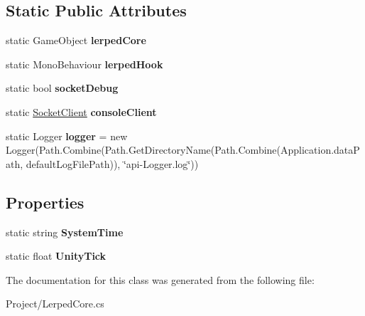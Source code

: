 \subsection*{Static Public Attributes}
\begin{DoxyCompactItemize}
\item 
\mbox{\label{class_lerp2_a_p_i_1_1_lerped_core_a4a12bc9584309efdafb06167891aa81a}} 
static Game\+Object {\bfseries lerped\+Core}
\item 
\mbox{\label{class_lerp2_a_p_i_1_1_lerped_core_a36e47f8f40f67a5a4f05398a161f8668}} 
static Mono\+Behaviour {\bfseries lerped\+Hook}
\item 
\mbox{\label{class_lerp2_a_p_i_1_1_lerped_core_ab9fe283b5fb0fc1b969c3c65ace74eb4}} 
static bool {\bfseries socket\+Debug}
\item 
\mbox{\label{class_lerp2_a_p_i_1_1_lerped_core_a16e880ea6278c92f3363dabb264a0eba}} 
static \hyperlink{class_lerp2_a_p_i_1_1_communication_1_1_sockets_1_1_socket_client}{Socket\+Client} {\bfseries console\+Client}
\item 
\mbox{\label{class_lerp2_a_p_i_1_1_lerped_core_a81701bd0c747037174737366a3c9e39b}} 
static Logger {\bfseries logger} = new Logger(Path.\+Combine(Path.\+Get\+Directory\+Name(Path.\+Combine(Application.\+data\+Path, default\+Log\+File\+Path)), \char`\"{}api-\/Logger.\+log\char`\"{}))
\end{DoxyCompactItemize}
\subsection*{Properties}
\begin{DoxyCompactItemize}
\item 
\mbox{\label{class_lerp2_a_p_i_1_1_lerped_core_aa7ee4068007163ee501483f0e305e653}} 
static string {\bfseries System\+Time}
\item 
\mbox{\label{class_lerp2_a_p_i_1_1_lerped_core_ac2243bfd26899fc6f82304198cc1b877}} 
static float {\bfseries Unity\+Tick}
\end{DoxyCompactItemize}


The documentation for this class was generated from the following file\+:\begin{DoxyCompactItemize}
\item 
Project/Lerped\+Core.\+cs\end{DoxyCompactItemize}

